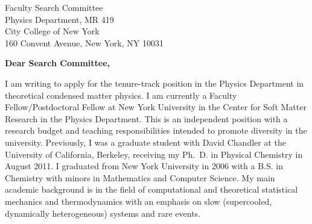 \documentclass{letter}
\begin{document}

\begin{letter}{Faculty Search Committee \\
Physics Department, MR 419 \\
City College of New York  \\
160 Convent Avenue, New York, NY 10031} %


\opening{\textbf{Dear Search Committee,}}
 
I am writing to apply for the tenure-track position in the Physics Department in theoretical condensed matter physics.  I am currently a Faculty Fellow/Postdoctoral Fellow at New York University in the Center for Soft Matter Research in the Physics Department.  This is an independent position with a research budget and teaching responsibilities intended to promote diversity in the university. Previously, I was a graduate student with David Chandler at the University of California, Berkeley, receiving my Ph.~D. in Physical Chemistry in August 2011.  I graduated from New York University in 2006 with a B.S. in Chemistry with minors in Mathematics and Computer Science.  My main academic background is in the field of computational and theoretical statistical mechanics and thermodynamics with an emphasis on slow (supercooled, dynamically heterogeneous) systems and rare events.



\end{letter}
\end{document}
